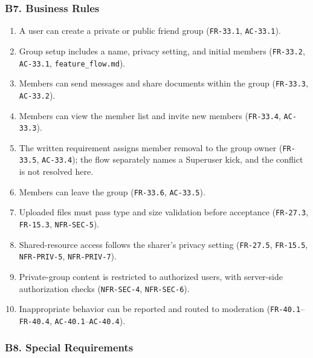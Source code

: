 \documentclass[12pt]{article}
\begin{document}
\subsubsection*{B7. Business Rules}
\par\medskip

\begin{enumerate}
\item A user can create a private or public friend group (\texttt{FR-33.1}, \texttt{AC-33.1}).
\item Group setup includes a name, privacy setting, and initial members (\texttt{FR-33.2}, \texttt{AC-33.1}, \texttt{feature\_flow.md}).
\item Members can send messages and share documents within the group (\texttt{FR-33.3}, \texttt{AC-33.2}).
\item Members can view the member list and invite new members (\texttt{FR-33.4}, \texttt{AC-33.3}).
\item The written requirement assigns member removal to the group owner (\texttt{FR-33.5}, \texttt{AC-33.4}); the flow separately names a Superuser kick, and the conflict is not resolved here.
\item Members can leave the group (\texttt{FR-33.6}, \texttt{AC-33.5}).
\item Uploaded files must pass type and size validation before acceptance (\texttt{FR-27.3}, \texttt{FR-15.3}, \texttt{NFR-SEC-5}).
\item Shared-resource access follows the sharer's privacy setting (\texttt{FR-27.5}, \texttt{FR-15.5}, \texttt{NFR-PRIV-5}, \texttt{NFR-PRIV-7}).
\item Private-group content is restricted to authorized users, with server-side authorization checks (\texttt{NFR-SEC-4}, \texttt{NFR-SEC-6}).
\item Inappropriate behavior can be reported and routed to moderation (\texttt{FR-40.1}--\texttt{FR-40.4}, \texttt{AC-40.1}--\texttt{AC-40.4}).
\end{enumerate}
\par\medskip

\hypertarget{sec:b8-special-requirements}{}
\subsubsection*{B8. Special Requirements}
\par\medskip
\end{document}
